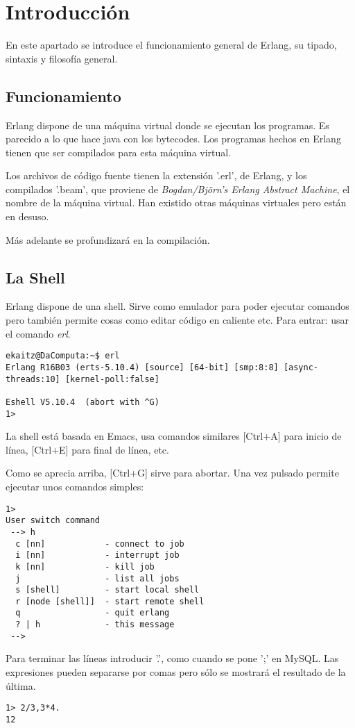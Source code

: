 \section{Introducción}

En este apartado se introduce el funcionamiento general de Erlang, su tipado, sintaxis y filosofía general.

\subsection{Funcionamiento}

Erlang dispone de una máquina virtual donde se ejecutan los programas. Es parecido a lo que hace java con los
bytecodes. Los programas hechos en Erlang tienen que ser compilados para esta máquina virtual.

Los archivos de código fuente tienen la extensión '.erl', de Erlang,  y los compilados '.beam', que proviene
de \textit{Bogdan/Björn's Erlang Abstract Machine}, el nombre de la máquina virtual. Han existido otras
máquinas virtuales pero están en desuso.

Más adelante se profundizará en la compilación.

\subsection{La Shell}

Erlang dispone de una shell. Sirve como emulador para poder ejecutar comandos pero también permite cosas como
editar código en caliente etc. Para entrar: usar el comando \textit{erl}.

\begin{lstlisting}
ekaitz@DaComputa:~$ erl
Erlang R16B03 (erts-5.10.4) [source] [64-bit] [smp:8:8] [async-threads:10] [kernel-poll:false]

Eshell V5.10.4  (abort with ^G)
1>
\end{lstlisting}

La shell está basada en Emacs, usa comandos similares [Ctrl+A] para inicio de línea, [Ctrl+E] para final de
línea, etc.


Como se aprecia arriba, [Ctrl+G] sirve para abortar. Una vez pulsado permite ejecutar unos comandos simples:


\begin{lstlisting}
1>
User switch command
 --> h
  c [nn]            - connect to job
  i [nn]            - interrupt job
  k [nn]            - kill job
  j                 - list all jobs
  s [shell]         - start local shell
  r [node [shell]]  - start remote shell
  q                 - quit erlang
  ? | h             - this message
 -->
\end{lstlisting}

Para terminar las líneas introducir '.', como cuando se pone ';' en MySQL. Las expresiones pueden separarse
por comas pero sólo se mostrará el resultado de la última.

\begin{lstlisting}
1> 2/3,3*4.
12
\end{lstlisting}
